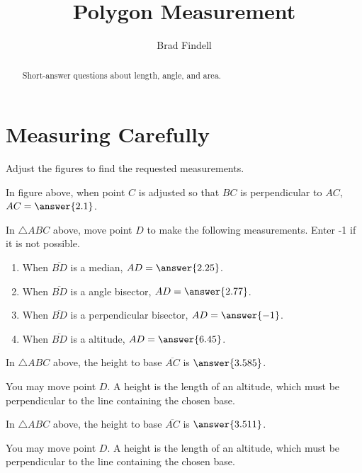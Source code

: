 \documentclass[nooutcomes]{ximera}
\title{Polygon Measurement}
\author{Brad Findell}
\begin{document}
\begin{abstract}
Short-answer questions about length, angle, and area. 
\end{abstract}
\maketitle

\section{Measuring Carefully}
Adjust the figures to find the requested measurements.  

\begin{center}  
\end{center}
\begin{problem}
In figure above, when point $C$ is adjusted so that $BC$ is perpendicular to $AC$, $AC=\answer{2.1}$.
\end{problem}


\begin{center}  
\end{center}
\begin{problem}
In $\triangle ABC$ above, move point $D$ to make the following measurements.  Enter -1 if it is not possible.   
\begin{enumerate}
\item When $\overline{BD}$ is a median, $AD=\answer{2.25}$.
\item When $\overline{BD}$ is a angle bisector, $AD=\answer{2.77}$.
\item When $\overline{BD}$ is a perpendicular bisector, $AD=\answer{-1}$.
\item When $\overline{BD}$ is a altitude, $AD=\answer{6.45}$.
\end{enumerate}
\end{problem}


\begin{center}  
\end{center}
\begin{problem}
In $\triangle ABC$ above, the height to base $\overline{AC}$ is $\answer{3.585}$.
\begin{hint}
You may move point $D$.  A height is the length of an altitude, which must be perpendicular to the line containing the chosen base.  
\end{hint}
\end{problem}

\begin{center}  
\end{center}
\begin{problem}
In $\triangle ABC$ above, the height to base $\overline{AC}$ is $\answer{3.511}$.
\begin{hint}
You may move point $D$.  A height is the length of an altitude, which must be perpendicular to the line containing the chosen base.  
\end{hint}
\end{problem}
\end{document}
